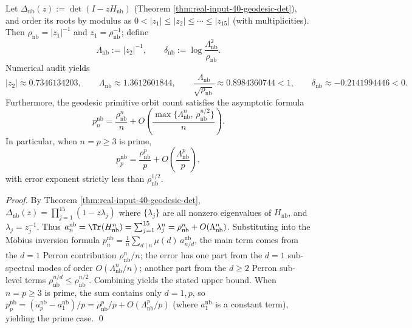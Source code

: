 \begin{corollary}\label{cor:real-input-40-geodesic-ramanujan-margin}
Let
\(
\Delta_{\mathrm{nb}}(z):=\det(I-zH_{\mathrm{nb}})
\)
(Theorem \ref{thm:real-input-40-geodesic-det}), and order its roots by modulus as
\(
0<|z_1|\le |z_2|\le\cdots\le |z_{15}|
\)
(with multiplicities).
Then \(\rho_{\mathrm{nb}}=|z_1|^{-1}\) and \(z_1=\rho_{\mathrm{nb}}^{-1}\);
define
\[
\Lambda_{\mathrm{nb}}:=|z_2|^{-1},\qquad
\delta_{\mathrm{nb}}:=\log\frac{\Lambda_{\mathrm{nb}}^2}{\rho_{\mathrm{nb}}}.
\]
Numerical audit yields
\[
|z_2|\approx 0.7346134203,\qquad
\Lambda_{\mathrm{nb}}\approx 1.3612601844,\qquad
\frac{\Lambda_{\mathrm{nb}}}{\sqrt{\rho_{\mathrm{nb}}}}\approx 0.8984360744<1,
\qquad
\delta_{\mathrm{nb}}\approx -0.2141994446<0.
\]
Furthermore, the geodesic primitive orbit count satisfies the asymptotic formula
\[
p_n^{\mathrm{nb}}
=\frac{\rho_{\mathrm{nb}}^n}{n}
+O\!\left(\frac{\max\{\Lambda_{\mathrm{nb}}^{n},\,\rho_{\mathrm{nb}}^{n/2}\}}{n}\right).
\]
In particular, when \(n=p\ge 3\) is prime,
\[
p_p^{\mathrm{nb}}=\frac{\rho_{\mathrm{nb}}^{p}}{p}+O\!\left(\frac{\Lambda_{\mathrm{nb}}^{p}}{p}\right),
\]
with error exponent strictly less than \(\rho_{\mathrm{nb}}^{1/2}\).
\end{corollary}
\begin{proof}
By Theorem \ref{thm:real-input-40-geodesic-det},
\(
\Delta_{\mathrm{nb}}(z)=\prod_{j=1}^{15}(1-z\lambda_j)
\)
where \(\{\lambda_j\}\) are all nonzero eigenvalues of \(H_{\mathrm{nb}}\), and \(\lambda_j=z_j^{-1}\).
Thus
\(
a_n^{\mathrm{nb}}=\Tr(H_{\mathrm{nb}}^n)=\sum_{j=1}^{15}\lambda_j^n
=\rho_{\mathrm{nb}}^n+O(\Lambda_{\mathrm{nb}}^n)
\).
Substituting into the M\"{o}bius inversion formula
\(
p_n^{\mathrm{nb}}=\frac1n\sum_{d\mid n}\mu(d)\,a_{n/d}^{\mathrm{nb}}
\),
the main term comes from the \(d=1\) Perron contribution \(\rho_{\mathrm{nb}}^n/n\);
the error has one part from the \(d=1\) sub-spectral modes of order \(O(\Lambda_{\mathrm{nb}}^n/n)\);
another part from the \(d\ge 2\) Perron sub-level terms \(\rho_{\mathrm{nb}}^{n/d}\le \rho_{\mathrm{nb}}^{n/2}\).
Combining yields the stated upper bound.
When \(n=p\ge 3\) is prime, the sum contains only \(d=1,p\), so
\(
p_p^{\mathrm{nb}}=(a_p^{\mathrm{nb}}-a_1^{\mathrm{nb}})/p
=\rho_{\mathrm{nb}}^{p}/p+O(\Lambda_{\mathrm{nb}}^{p}/p)
\)
(where \(a_1^{\mathrm{nb}}\) is a constant term), yielding the prime case. \qed
\end{proof}

